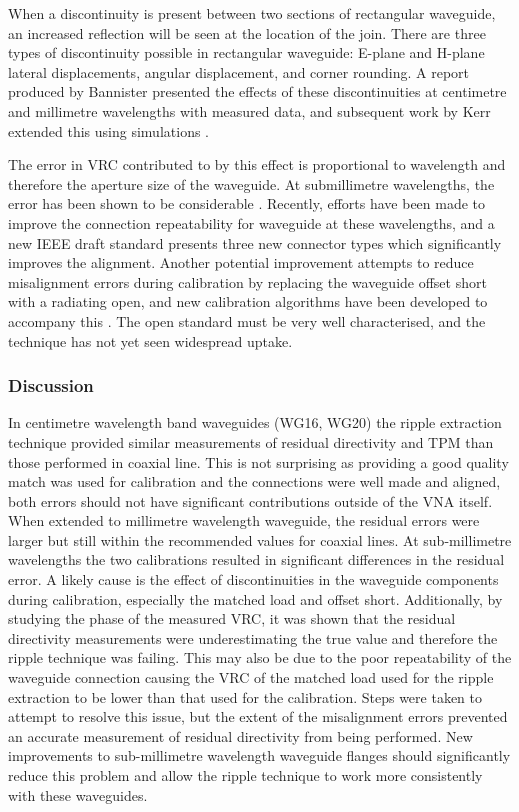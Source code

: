 \documentclass[../thesis/thesis.tex]{subfiles}
\begin{document}
\begin{refsection}
When a discontinuity is present between two sections of rectangular waveguide, an increased reflection will be seen at the location of the join. There are three types of discontinuity possible in rectangular waveguide: E-plane and H-plane lateral displacements, angular displacement, and corner rounding. A report produced by Bannister \cite{Bannister_1989} presented the effects of these discontinuities at centimetre and millimetre wavelengths with measured data, and subsequent work by Kerr extended this using simulations \cite{Kerr_1999, Kerr_2010}. 

The error in VRC contributed to by this effect is proportional to wavelength and therefore the aperture size of the waveguide. At submillimetre wavelengths, the error has been shown to be considerable \cite{Williams_2011, Li_2012}. Recently, efforts have been made to improve the connection repeatability for waveguide at these wavelengths, and a new IEEE draft standard \cite{IEEE1785} presents three new connector types which significantly improves the alignment. Another potential improvement attempts to reduce misalignment errors during calibration by replacing the waveguide offset short with a radiating open, and new calibration algorithms have been developed to accompany this \cite{Arsenovic_2014}. The open standard must be very well characterised, and the technique has not yet seen widespread uptake.

\subsubsection{Discussion}

In centimetre wavelength band waveguides (WG16, WG20) the ripple extraction technique provided similar measurements of residual directivity and TPM than those performed in coaxial line. This is not surprising as providing a good quality match was used for calibration and the connections were well made and aligned, both errors should not have significant contributions outside of the VNA itself. When extended to millimetre wavelength waveguide, the residual errors were larger but still within the recommended values for coaxial lines. At sub-millimetre wavelengths the two calibrations resulted in significant differences in the residual error. A likely cause is the effect of discontinuities in the waveguide components during calibration, especially the matched load and offset short. Additionally, by studying the phase of the measured VRC, it was shown that the residual directivity measurements were underestimating the true value and therefore the ripple technique was failing. This may also be due to the poor repeatability of the waveguide connection causing the VRC of the matched load used for the ripple extraction to be lower than that used for the calibration. Steps were taken to attempt to resolve this issue, but the extent of the misalignment errors prevented an accurate measurement of residual directivity from being performed. New improvements to sub-millimetre wavelength waveguide flanges should significantly reduce this problem and allow the ripple technique to work more consistently with these waveguides.


\end{refsection}
\end{document}
